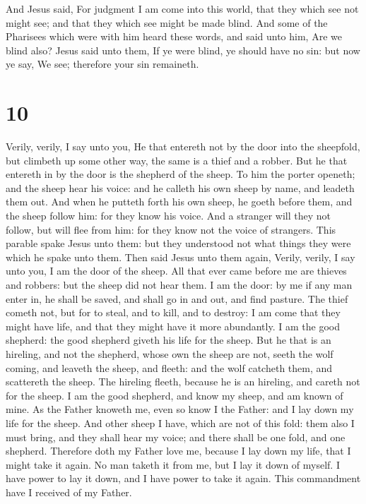  And Jesus said, For judgment I am come into this world,
that they which see not might see; and that they which see might be made
blind.  And some of the Pharisees which were with him heard
these words, and said unto him, Are we blind also?  Jesus
said unto them, If ye were blind, ye should have no sin: but now ye say,
We see; therefore your sin remaineth.

\hypertarget{section-9}{%
\section{10}\label{section-9}}

 Verily, verily, I say unto you, He that entereth not by the
door into the sheepfold, but climbeth up some other way, the same is a
thief and a robber.  But he that entereth in by the door is
the shepherd of the sheep.  To him the porter openeth; and
the sheep hear his voice: and he calleth his own sheep by name, and
leadeth them out.  And when he putteth forth his own sheep,
he goeth before them, and the sheep follow him: for they know his voice.
 And a stranger will they not follow, but will flee from
him: for they know not the voice of strangers.  This parable
spake Jesus unto them: but they understood not what things they were
which he spake unto them.  Then said Jesus unto them again,
Verily, verily, I say unto you, I am the door of the sheep. 
All that ever came before me are thieves and robbers: but the sheep did
not hear them.  I am the door: by me if any man enter in, he
shall be saved, and shall go in and out, and find pasture. 
The thief cometh not, but for to steal, and to kill, and to destroy: I
am come that they might have life, and that they might have it more
abundantly.  I am the good shepherd: the good shepherd
giveth his life for the sheep.  But he that is an hireling,
and not the shepherd, whose own the sheep are not, seeth the wolf
coming, and leaveth the sheep, and fleeth: and the wolf catcheth them,
and scattereth the sheep.  The hireling fleeth, because he
is an hireling, and careth not for the sheep.  I am the
good shepherd, and know my sheep, and am known of mine.  As
the Father knoweth me, even so know I the Father: and I lay down my life
for the sheep.  And other sheep I have, which are not of
this fold: them also I must bring, and they shall hear my voice; and
there shall be one fold, and one shepherd.  Therefore doth
my Father love me, because I lay down my life, that I might take it
again.  No man taketh it from me, but I lay it down of
myself. I have power to lay it down, and I have power to take it again.
This commandment have I received of my Father.

